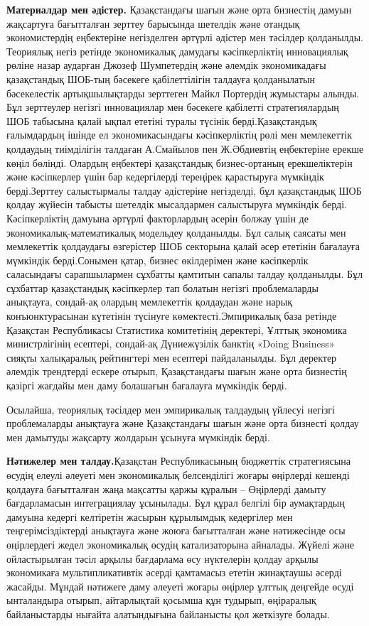 {\bfseries Материалдар мен әдістер.} Қазақстандағы шағын және орта
бизнестің дамуын жақсартуға бағытталған зерттеу барысында шетелдік және
отандық экономистердің еңбектеріне негізделген әртүрлі әдістер мен
тәсілдер қолданылды. Теориялық негіз ретінде экономикалық дамудағы
кәсіпкерліктің инновациялық рөліне назар аударған Джозеф Шумпетердің
және әлемдік экономикадағы қазақстандық ШОБ-тың бәсекеге қабілеттілігін
талдауға қолданылатын бәсекелестік артықшылықтарды зерттеген Майкл
Портердің жұмыстары алынды. Бұл зерттеулер негізгі инновациялар мен
бәсекеге қабілетті стратегиялардың ШОБ табысына қалай ықпал ететіні
туралы түсінік берді.Қазақстандық ғалымдардың ішінде ел экономикасындағы
кәсіпкерліктің рөлі мен мемлекеттік қолдаудың тиімділігін талдаған
А.Смайылов пен Ж.Әбдиевтің еңбектеріне ерекше көңіл бөлінді. Олардың
еңбектері қазақстандық бизнес-ортаның ерекшеліктерін және кәсіпкерлер
үшін бар кедергілерді тереңірек қарастыруға мүмкіндік берді.Зерттеу
салыстырмалы талдау әдістеріне негізделді, бұл қазақстандық ШОБ қолдау
жүйесін табысты шетелдік мысалдармен салыстыруға мүмкіндік берді.
Кәсіпкерліктің дамуына әртүрлі факторлардың әсерін болжау үшін де
экономикалық-математикалық модельдеу қолданылды. Бұл салық саясаты мен
мемлекеттік қолдаудағы өзгерістер ШОБ секторына қалай әсер ететінін
бағалауға мүмкіндік берді.Сонымен қатар, бизнес өкілдерімен және
кәсіпкерлік саласындағы сарапшылармен сұхбатты қамтитын сапалы талдау
қолданылды. Бұл сұхбаттар қазақстандық кәсіпкерлер тап болатын негізгі
проблемаларды анықтауға, сондай-ақ олардың мемлекеттік қолдаудан және
нарық конъюнктурасынан күтетінін түсінуге көмектесті.Эмпирикалық база
ретінде Қазақстан Республикасы Статистика комитетінің деректері, Ұлттық
экономика министрлігінің есептері, сондай-ақ Дүниежүзілік банктің «Doing
Business» сияқты халықаралық рейтингтері мен есептері пайдаланылды. Бұл
деректер әлемдік трендтерді ескере отырып, Қазақстандағы шағын және орта
бизнестің қазіргі жағдайы мен даму болашағын бағалауға мүмкіндік берді.

Осылайша, теориялық тәсілдер мен эмпирикалық талдаудың үйлесуі негізгі
проблемаларды анықтауға және Қазақстандағы шағын және орта бизнесті
қолдау мен дамытуды жақсарту жолдарын ұсынуға мүмкіндік берді.

{\bfseries Нәтижелер мен талдау.}Қазақстан Республикасының бюджеттік
стратегиясына өсудің елеулі әлеуеті мен экономикалық белсенділігі жоғары
өңірлерді кешенді қолдауға бағытталған жаңа мақсатты қаржы құралын --
Өңірлерді дамыту бағдарламасын интеграциялау ұсынылады. Бұл құрал
белгілі бір аумақтардың дамуына кедергі келтіретін жасырын құрылымдық
кедергілер мен теңгерімсіздіктерді анықтауға және жоюға бағытталған және
нәтижесінде осы өңірлердегі жедел экономикалық өсудің катализаторына
айналады. Жүйелі және ойластырылған тәсіл арқылы бағдарлама өсу
нүктелерін қолдау арқылы экономикаға мультипликативтік әсерді қамтамасыз
ететін жинақтаушы әсерді жасайды. Мұндай нәтижеге даму әлеуеті жоғары
өңірлер ұлттық деңгейде өсуді ынталандыра отырып, айтарлықтай қосымша
құн тудырып, өңіраралық байланыстарды нығайта алатындығына байланысты
қол жеткізуге болады.

